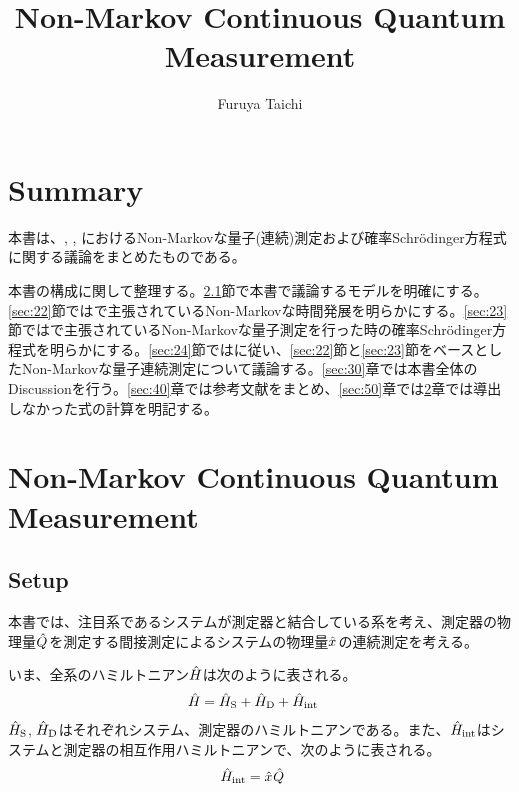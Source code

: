 \documentclass[10pt, a4paper]{jsarticle}
\begin{document}
\title{Non-Markov Continuous Quantum Measurement}
\author{Furuya Taichi}
\date{}
\maketitle

\section{Summary}
\label{sec:10}
本書は、\cite{diosi2008retarted}, \cite{diosi1993master}, \cite{gambetta2002non-markov}におけるNon-Markovな量子(連続)測定および確率Schr\"{o}dinger方程式に関する議論をまとめたものである。

本書の構成に関して整理する。\ref{sec:21}節で本書で議論するモデルを明確にする。\ref{sec:22}節では\cite{diosi2008retarted}で主張されているNon-Markovな時間発展を明らかにする。\ref{sec:23}節では\cite{gambetta2002non-markov}で主張されているNon-Markovな量子測定を行った時の確率Schr\"{o}dinger方程式を明らかにする。\ref{sec:24}節では\cite{diosi2008retarted}に従い、\ref{sec:22}節と\ref{sec:23}節をベースとしたNon-Markovな量子連続測定について議論する。\ref{sec:30}章では本書全体のDiscussionを行う。\ref{sec:40}章では参考文献をまとめ、\ref{sec:50}章では\ref{sec:20}章では導出しなかった式の計算を明記する。

\section{Non-Markov Continuous Quantum Measurement}
\label{sec:20}

\subsection{Setup}
\label{sec:21}

本書では、注目系であるシステムが測定器と結合している系を考え、測定器の物理量$\hat{Q}_{}$を測定する間接測定によるシステムの物理量$\hat{x}_{}$の連続測定を考える。

いま、全系のハミルトニアン$\hat{H}_{\rm }$は次のように表される。
\begin{equation}
\begin{split}
\label{eq:21}
	\hat{H}_{\rm } &= \hat{H}_{\rm S} + \hat{H}_{\rm D} + \hat{H}_{\rm int}
\end{split}
\end{equation}
$\hat{H}_{\rm S}$, $\hat{H}_{\rm D}$はそれぞれシステム、測定器のハミルトニアンである。また、$\hat{H}_{\rm int}$はシステムと測定器の相互作用ハミルトニアンで、次のように表される。
\begin{equation}
\begin{split}
\label{eq:22}
	\hat{H}_{\rm int} &= \hat{x}_{} \hat{Q}_{}
\end{split}
\end{equation}
\end{document}
